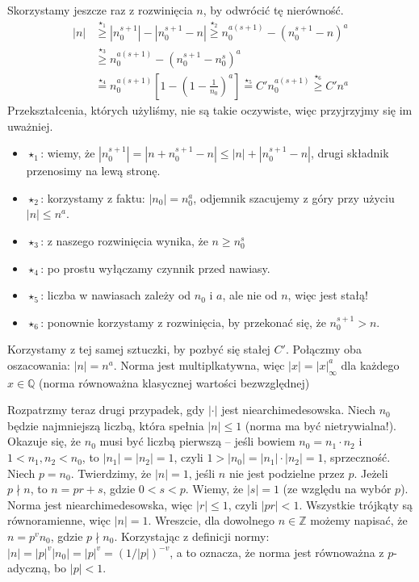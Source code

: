 \documentclass[a4paper,fleqn]{article}
\newenvironment{itemx}{\begin{itemize}
	\setlength{\itemsep}{0pt}
	\setlength{\parskip}{0pt}
	\setlength{\parsep}{0pt}}
{\end{itemize}}
\begin{document}
\begin{multicols}{2}
Skorzystamy jeszcze raz z rozwinięcia $n$, by odwrócić tę nierówność.
\begin{align*}
|n| & \overset{\star_1}{\ge}
\left|n_0^{s+1}\right| - \left|n_0^{s+1} - n\right| \overset{\star_2}{\ge}
n_0^{a(s+1)} - \left(n_0^{s+1} - n\right)^a \\ & \overset{\star_3}{\ge} 
n_0^{a(s+1)} - \left(n_0^{s+1} - n_0^s\right)^a  \\ & \overset{\star_4}{=}
n_0^{a(s+1)} \left[1 - \left( 1 - \frac{1}{n_0}\right)^a\right]  \overset{\star_5}{=}
C' n_0^{a(s+1)} \overset{\star_6}{\ge}
C' n^a 
\end{align*}
Przekształcenia, których użyliśmy, nie są takie oczywiste, więc przyjrzyjmy się im uważniej.
\begin{itemx}
\item $\star_1$: wiemy, że $|n_0^{s+1}| = |n+n_0^{s+1}-n| \le |n| + |n_0^{s+1} - n|$, drugi składnik przenosimy na lewą stronę.
\item $\star_2$: korzystamy z faktu: $|n_0| = n_0^a$, odjemnik szacujemy z góry przy użyciu $| n| \le n^a$.
\item $\star_3$: z naszego rozwinięcia wynika, że $n \ge n_0^s$
\item $\star_4$: po prostu wyłączamy czynnik przed nawiasy.
\item $\star_5$: liczba w nawiasach zależy od $n_0$ i $a$, ale nie od $n$, więc jest stałą!
\item $\star_6$: ponownie korzystamy z rozwinięcia, by przekonać się, że $n_0^{s+1} > n$.
\end{itemx}

Korzystamy z tej samej sztuczki, by pozbyć się stałej $C'$. Połączmy oba oszacowania: $|n| = n^a$. Norma jest multiplkatywna, więc $|x| = |x|_\infty^a$ dla każdego $x\in\mathbb Q$ (norma równoważna klasycznej wartości bezwzględnej)

Rozpatrzmy teraz drugi przypadek, gdy $|\cdot|$ jest niearchimedesowska. Niech $n_0$ będzie najmniejszą liczbą, która spełnia $|n| \le 1$ (norma ma być nietrywialna!). Okazuje się, że $n_0$ musi być liczbą pierwszą -- jeśli bowiem $n_0 = n_1 \cdot n_2$ i $1 < n_1, n_2 < n_0$, to $|n_1| = |n_2| = 1$, czyli $1 > |n_0| = |n_1| \cdot |n_2| = 1$, sprzeczność. Niech $p = n_0$. Twierdzimy, że $|n| = 1$, jeśli $n$ nie jest podzielne przez $p$. Jeżeli $p\nmid n$, to $n = pr+s$, gdzie $0 < s < p$. Wiemy, że $|s| = 1$ (ze względu na wybór $p$). Norma jest niearchimedesowska, więc $|r| \le 1$, czyli $|pr| < 1$. Wszystkie trójkąty są równoramienne, więc $|n| = 1$. Wreszcie, dla dowolnego $n\in\mathbb Z$ możemy napisać, że $n = p^vn_0$, gdzie $p\nmid n_0$. Korzystając z definicji normy: $|n| = |p|^v |n_0| = |p|^v = (1/|p|)^{-v}$, a to oznacza, że norma jest równoważna z $p$-adyczną, bo $|p| < 1$.


\end{multicols}
\end{document}
